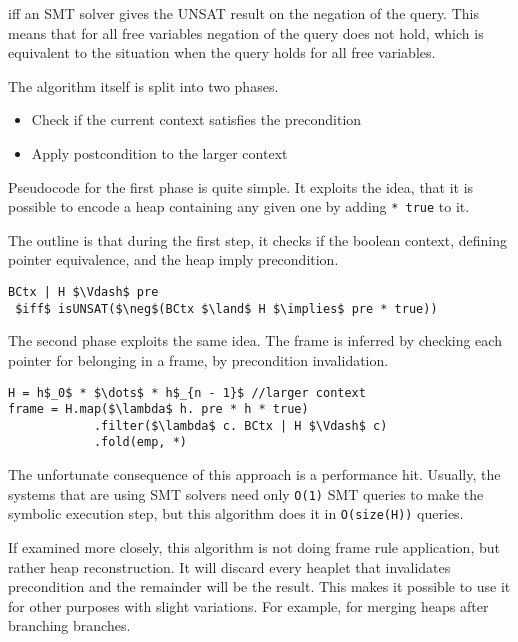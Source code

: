 \documentclass[sigplan,screen,review]{acmart}
\begin{document}
iff an SMT solver gives the UNSAT result on the negation of the query. This means that for all free variables negation of the query does not hold, which is equivalent to the situation when the query holds for all free variables. 

\begin{prooftree}
\end{prooftree}

The algorithm itself is split into two phases. 

\begin{itemize}
    \item Check if the current context satisfies the precondition
    \item Apply postcondition to the larger context
\end{itemize}

Pseudocode for the first phase is quite simple. It exploits the idea, that it is possible to encode a heap containing any given one by adding \texttt{* true} to it. 

The outline is that during the first step, it checks if the boolean context, defining pointer equivalence, and the heap imply precondition.

\begin{lstlisting}[mathescape]
BCtx | H $\Vdash$ pre 
 $iff$ isUNSAT($\neg$(BCtx $\land$ H $\implies$ pre * true))
\end{lstlisting}

The second phase exploits the same idea. The frame is inferred by checking each pointer for belonging in a frame, by precondition invalidation.

\begin{lstlisting}[mathescape]
H = h$_0$ * $\dots$ * h$_{n - 1}$ //larger context
frame = H.map($\lambda$ h. pre * h * true)
            .filter($\lambda$ c. BCtx | H $\Vdash$ c)
            .fold(emp, *)

\end{lstlisting}

The unfortunate consequence of this approach is a performance hit. Usually, the systems that are using SMT solvers need only \texttt{O(1)} SMT queries to make the symbolic execution step, but this algorithm does it in \texttt{O(size(H))} queries. 

If examined more closely, this algorithm is not doing frame rule application, but rather heap reconstruction. It will discard every heaplet that invalidates precondition and the remainder will be the result. This makes it possible to use it for other purposes with slight variations. For example, for merging heaps after branching branches. 
\end{document}
